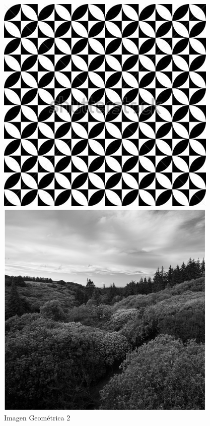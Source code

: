 \documentclass{article}
\begin{document}
\begin{figure}[H]
  \includegraphics[width=\linewidth]{geometrica_2}
  \caption{Imagen Geométrica 2}\label{fig:geometrica_2}
\endminipage\hfill
{}
  \includegraphics[width=\linewidth]{paisaje_2}

\end{figure}
\end{document}
